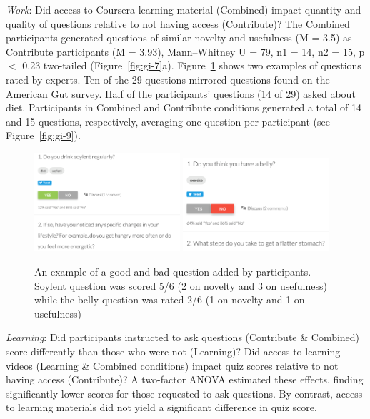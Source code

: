 \textit{Work}: Did access to Coursera learning material (Combined) impact quantity and quality of questions relative to not having access (Contribute)? The Combined participants generated questions of similar novelty and usefulness (M = 3.5) as Contribute participants (M = 3.93), Mann–Whitney U = 79, n1 = 14, n2 = 15, p $<$ 0.23 two-tailed (Figure~\ref{fig:gi-7}a). Figure~\ref{fig:gi-8} shows two examples of questions rated by experts. Ten of the 29 questions mirrored questions found on the American Gut survey. Half of the participants’ questions (14 of 29) asked about diet. Participants in Combined and Contribute conditions generated a total of 14 and 15 questions, respectively, averaging one question per participant (see Figure~\ref{fig:gi-9}). 

\begin{figure}[h] 
  \centering
  \includegraphics[width=0.48\textwidth]{figures/gutinstinct/gi-8a.png}
  \includegraphics[width=0.48\textwidth]{figures/gutinstinct/gi-8b.png}
  \caption[Examples of questions added by participants]
{An example of a good and bad question added by participants. Soylent question was scored 5/6 (2 on novelty and 3 on usefulness) while the belly question was rated 2/6 (1 on novelty and 1 on usefulness) }
  \label{fig:gi-8}
\end{figure}

\textit{Learning}: Did participants instructed to ask questions (Contribute \& Combined) score differently than those who were not (Learning)? Did access to learning videos (Learning \& Combined conditions) impact quiz scores relative to not having access (Contribute)? A two-factor ANOVA estimated these effects, finding significantly lower scores for those requested to ask questions. By contrast, access to learning materials did not yield a significant difference in quiz score.

